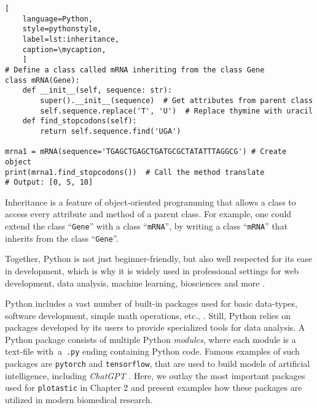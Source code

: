 \def\mycaption{ Example of inheritance in Python.
    The class ``\texttt{mRNA}'' inherits from the class ``\texttt{Gene}''. The class
    ``\texttt{mRNA}'' has two methods, ``\texttt{\_\_init\_\_}'' and
    ``\texttt{find\_stopcodon}''. The method ``\texttt{find\_stopcodon}'' finds the
    position of stop codons. }
\begin{lstlisting}[
    language=Python,
    style=pythonstyle,
    label=lst:inheritance,
    caption=\mycaption,
    ]
# Define a class called mRNA inheriting from the class Gene
class mRNA(Gene):
    def __init__(self, sequence: str):
        super().__init__(sequence)  # Get attributes from parent class
        self.sequence.replace('T', 'U')  # Replace thymine with uracil
    def find_stopcodons(self):
        return self.sequence.find('UGA')

mrna1 = mRNA(sequence='TGAGCTGAGCTGATGCGCTATATTTAGGCG') # Create object
print(mrna1.find_stopcodons())  # Call the method translate
# Output: [0, 5, 10]
\end{lstlisting}

Inheritance is a feature of object-oriented programming that allows
a class to access every attribute and method of a parent class. For example, one
could extend the class ``\texttt{Gene}'' with a class ``\texttt{mRNA}'', by
writing a class ``\texttt{mRNA}'' that inherits from the class ``\texttt{Gene}''.

Together, Python is not just beginner-friendly, but also well respected for its
ease in development, which is why it is widely used in professional settings for
web development, data analysis, machine learning, biosciences and more
\cite{ekmekciIntroductionProgrammingBioscientists2016,rayhanRisePythonSurvey2023}.

\label{sec:python_packages}
Python includes a vast number of built-in packages used for basic data-types,
software development, simple math operations, etc.,
\cite{PythonLanguageReference2024}. Still, Python relies on packages developed
by its users to provide specialized tools for data analysis. A Python package
consists of multiple Python \emph{modules}, where each module is a text-file
with~a~\texttt{.py} ending containing Python code. Famous examples of such
packages are \texttt{pytorch} and \texttt{tensorflow}, that are used to build
models of artificial intelligence, including \textit{ChatGPT}
\cite{paszkePyTorchImperativeStyle2019, abadiTensorFlowLargeScaleMachine2016,
    radfordLanguageModelsAre2019}. Here, we outlay the most important packages used
for \texttt{plotastic} in Chapter 2 and present examples how these packages are
utilized in modern biomedical research.

